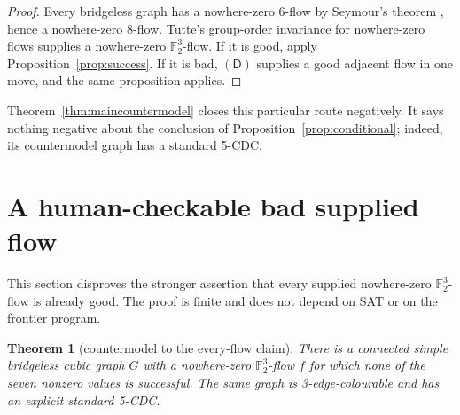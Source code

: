 \documentclass[11pt]{article}
\newtheorem{theorem}{Theorem}[section]
\theoremstyle{definition}
\theoremstyle{remark}
\newcommand{\F}{\mathbb F}
\begin{document}
\begin{proof}
Every bridgeless graph has a nowhere-zero 6-flow by Seymour's theorem
\cite{seymour1981}, hence a nowhere-zero 8-flow.  Tutte's group-order
invariance for nowhere-zero flows \cite{tutte1954} supplies a nowhere-zero
\(\F_2^3\)-flow.  If it is good, apply
Proposition~\ref{prop:success}.  If it is bad,
\((\mathsf D)\) supplies a good adjacent flow in one move,
and the same proposition applies.
\end{proof}

Theorem~\ref{thm:maincountermodel} closes this particular route
negatively.  It says nothing negative about the conclusion of
Proposition~\ref{prop:conditional}; indeed, its countermodel graph has a
standard 5-CDC.

\section{A human-checkable bad supplied flow}
\label{sec:countermodel}

This section disproves the stronger assertion that every supplied
nowhere-zero \(\F_2^3\)-flow is already good.  The proof is finite and does
not depend on SAT or on the frontier program.

\begin{theorem}[countermodel to the every-flow claim]\label{thm:countermodel}
There is a connected simple bridgeless cubic graph \(G\) with a
nowhere-zero \(\F_2^3\)-flow \(f\) for which none of the seven nonzero
values is successful.  The same graph is 3-edge-colourable and has an
explicit standard 5-CDC.
\end{theorem}
\end{document}

